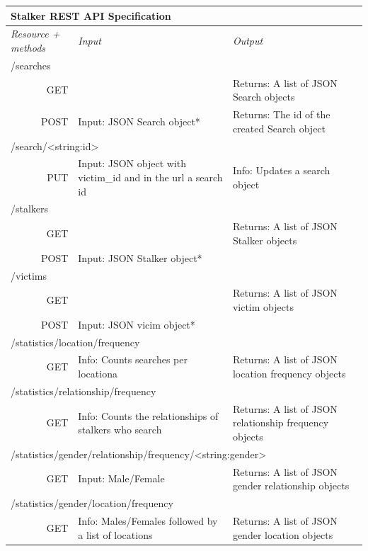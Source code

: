 \begin{table}[ht]
\begin{tabularx}{\textwidth}{rXX}
\hline
\multicolumn{3}{l}{\cellcolor[HTML]{C0C0C0}\textbf{Stalker REST API Specification}} \\ \hline
\multicolumn{1}{l}{\textit{Resource + methods}} & \textit{Input} & \textit{Output} \\ \hline
\multicolumn{3}{l}{\cellcolor[HTML]{EFEFEF}/searches} \\ \hline
GET &  & Returns: A list of JSON Search objects \\ \hline
POST & Input: JSON Search object* & Returns: The id of the created Search object \\ \hline
\multicolumn{3}{l}{\cellcolor[HTML]{EFEFEF}/search/\textless string:id\textgreater} \\ \hline
PUT & Input: JSON object with victim\_id and in the url a search id & Info: Updates a search object \\ \hline
\multicolumn{3}{l}{\cellcolor[HTML]{EFEFEF}/stalkers} \\ \hline
GET &  & Returns: A list of JSON Stalker objects \\ \hline
POST & Input: JSON Stalker object* &  \\ \hline
\multicolumn{3}{l}{\cellcolor[HTML]{EFEFEF}/victims} \\ \hline
GET &  & Returns: A list of JSON victim objects \\ \hline
POST & Input: JSON vicim object* &  \\ \hline
\multicolumn{3}{l}{\cellcolor[HTML]{EFEFEF}/statistics/location/frequency} \\ \hline
GET & Info: Counts searches per locationa & Returns: A list of JSON location frequency objects \\ \hline
\multicolumn{3}{l}{\cellcolor[HTML]{EFEFEF}/statistics/relationship/frequency} \\ \hline
GET & Info: Counts the relationships of stalkers who search & Returns: A list of JSON relationship frequency objects \\ \hline
\multicolumn{3}{l}{\cellcolor[HTML]{EFEFEF}/statistics/gender/relationship/frequency/\textless string:gender\textgreater} \\ \hline
GET & Input: Male/Female & Returns: A list of JSON gender relationship objects \\ \hline
\multicolumn{3}{l}{\cellcolor[HTML]{EFEFEF}/statistics/gender/location/frequency} \\ \hline
GET & Info: Males/Females followed by a list of locations & Returns: A list of JSON gender location objects \\ \hline
\end{tabularx}
\end{table}

